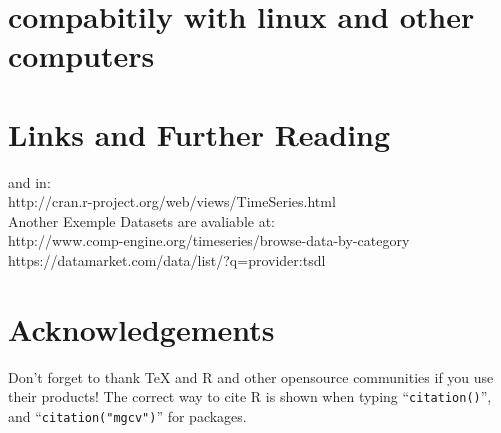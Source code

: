 \documentclass[11pt, a4paper]{article} %
\begin{document}
\section{compabitily with linux and other computers}


\section{Links and Further Reading}%
and in:\\
http://cran.r-project.org/web/views/TimeSeries.html\\
Another Exemple Datasets are avaliable at:\\
http://www.comp-engine.org/timeseries/browse-data-by-category\\
https://datamarket.com/data/list/?q=provider:tsdl\\
\section{Acknowledgements}%
Don't forget to thank TeX and R and other opensource communities if you use their products! The correct way to cite R is shown when typing ``\texttt{citation()}'', and ``\texttt{citation("mgcv")}'' for packages.
\clearpage
\end{document}
